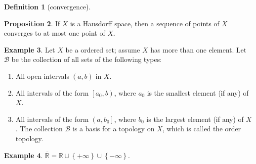 \documentclass[12pt,a4paper]{book}
\newcommand{\bbrace}[1]{\left\{ #1 \right\} }
\newcommand{\bb}[1]{\mathbb{#1}}
\newenvironment{enu}{\begin{enumerate}[(1)]}{\end{enumerate}}
\theoremstyle{definition}
\newtheorem{defn}{Definition}[section]
\newtheorem{prop}[defn]{Proposition}
\newtheorem{exam}[defn]{Example}
\begin{document}
\begin{defn}[convergence]

\end{defn}
\begin{prop}
    If $X$ is a Hausdorff space, then a sequence of points of $X$ converges to at most one point of $X$.
\end{prop}
\begin{exam}
    Let $X$ be a ordered set; assume $X$ has more than one element. Let $\mathcal{B}$ be the collection of all sets of the following types:
    \begin{enu}
        \item All open intervals $(a, b)$ in $X$.
        \item All intervals of the form $\left[a_0, b\right)$, where $a_0$ is the smallest element (if any) of $X$.
        \item  All intervals of the form $\left(a, b_0\right]$, where $b_0$ is the largest element (if any) of $X$. The collection $\mathcal{B}$ is a basis for a topology on $X$, which is called the order topology.
    \end{enu}
\end{exam}
\begin{exam}
    $\overline{\bb{R}}=\bb{R}\cup\bbrace{+\infty}\cup\bbrace{-\infty}$.
\end{exam}
\end{document}
